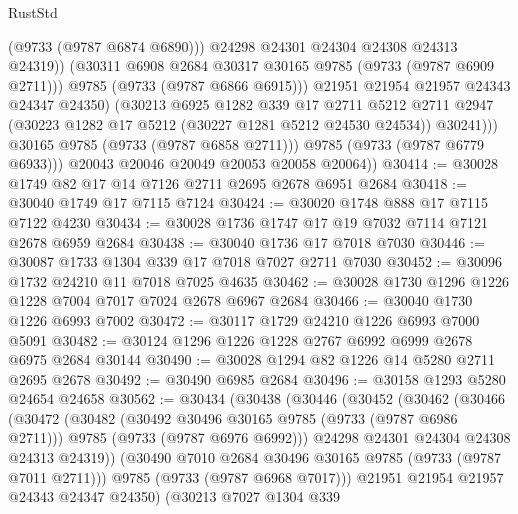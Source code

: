 \begin{lexlean}{RustStd}
\begin{coremodule}
                          (@9733 (@9787 @6874 @6890)))
                        @24298
                        @24301
                        @24304
                        @24308
                        @24313
                        @24319))
                    (@30311 @6908 @2684 @30317 @30165 @9785 (@9733 (@9787 @6909 @2711)))
                    @9785
                    (@9733 (@9787 @6866 @6915)))
                  @21951
                  @21954
                  @21957
                  @24343
                  @24347
                  @24350)
                (@30213
                  @6925
                  @1282
                  @339
                  @17
                  @2711
                  @5212
                  @2711
                  @2947
                  (@30223 @1282 @17 @5212 (@30227 @1281 @5212 @24530 @24534))
                  @30241)))
            @30165
            @9785
            (@9733 (@9787 @6858 @2711)))
          @9785
          (@9733 (@9787 @6779 @6933)))
        @20043
        @20046
        @20049
        @20053
        @20058
        @20064))
@30414 := @30028 @1749 @82 @17 @14 @7126 @2711 @2695 @2678 @6951 @2684
@30418 := @30040 @1749 @17 @7115 @7124
@30424 := @30020 @1748 @888 @17 @7115 @7122 @4230
@30434 := @30028 @1736 @1747 @17 @19 @7032 @7114 @7121 @2678 @6959 @2684
@30438 := @30040 @1736 @17 @7018 @7030
@30446 := @30087 @1733 @1304 @339 @17 @7018 @7027 @2711 @7030
@30452 := @30096 @1732 @24210 @11 @7018 @7025 @4635
@30462 := @30028 @1730 @1296 @1226 @1228 @7004 @7017 @7024 @2678 @6967 @2684
@30466 := @30040 @1730 @1226 @6993 @7002
@30472 := @30117 @1729 @24210 @1226 @6993 @7000 @5091
@30482 := @30124 @1296 @1226 @1228 @2767 @6992 @6999 @2678 @6975 @2684 @30144
@30490 := @30028 @1294 @82 @1226 @14 @5280 @2711 @2695 @2678
@30492 := @30490 @6985 @2684
@30496 := @30158 @1293 @5280 @24654 @24658
@30562 := @30434
    (@30438
      (@30446
        (@30452
          (@30462
            (@30466
              (@30472
                (@30482
                  (@30492 @30496 @30165 @9785 (@9733 (@9787 @6986 @2711)))
                  @9785
                  (@9733 (@9787 @6976 @6992)))
                @24298
                @24301
                @24304
                @24308
                @24313
                @24319))
            (@30490 @7010 @2684 @30496 @30165 @9785 (@9733 (@9787 @7011 @2711)))
            @9785
            (@9733 (@9787 @6968 @7017)))
          @21951
          @21954
          @21957
          @24343
          @24347
          @24350)
        (@30213
          @7027
          @1304
          @339

\end{coremodule}
\end{lexlean}
